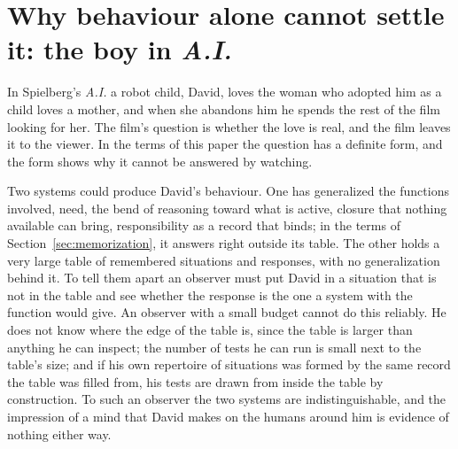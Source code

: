 \appendix
\section{Why behaviour alone cannot settle it: the boy in \emph{A.I.}}
\label{app:memorization}

In Spielberg's \emph{A.I.} \citep{spielberg2001} a robot child, David, loves the woman who adopted him
as a child loves a mother, and when she abandons him he spends the rest of the film looking for her.
The film's question is whether the love is real, and the film leaves it to the viewer. In the terms of
this paper the question has a definite form, and the form shows why it cannot be answered by watching.

Two systems could produce David's behaviour. One has generalized the functions involved, need, the
bend of reasoning toward what is active, closure that nothing available can bring, responsibility as a
record that binds; in the terms of Section~\ref{sec:memorization}, it answers right outside its table.
The other holds a very large table of remembered situations and responses, with no generalization
behind it. To tell them apart an observer must put David in a situation that is not in the table and
see whether the response is the one a system with the function would give. An observer with a small
budget cannot do this reliably. He does not know where the edge of the table is, since the table is
larger than anything he can inspect; the number of tests he can run is small next to the table's size;
and if his own repertoire of situations was formed by the same record the table was filled from, his
tests are drawn from inside the table by construction. To such an observer the two systems are
indistinguishable, and the impression of a mind that David makes on the humans around him is
evidence of nothing either way.

